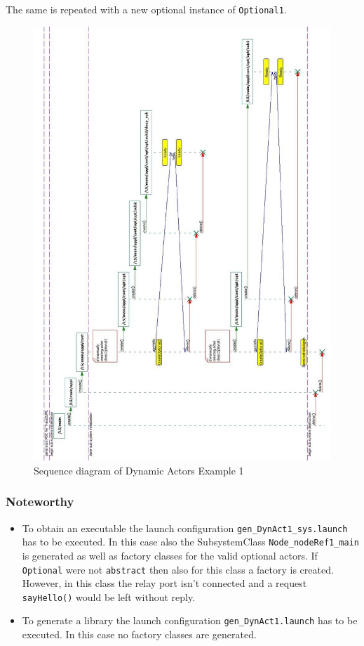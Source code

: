 The same is repeated with a new optional instance of \texttt{Optional1}.

\begin{figure}
\includegraphics[scale=0.45]{images/039-DynAct1-MSC.jpg}
\caption{Sequence diagram of Dynamic Actors Example 1}
\label{fig:dynact1_msc}
\end{figure}

\subsubsection{Noteworthy}

\begin{itemize}
\item To obtain an executable the launch configuration \texttt{gen\_DynAct1\_sys.launch} has to be executed.
In this case also the SubsystemClass \texttt{Node\_nodeRef1\_main} is generated as well as factory classes
for the valid optional actors. If \texttt{Optional} were not \texttt{abstract} then also for this class
a factory is created. However, in this class the relay port isn't connected and a request \texttt{sayHello()}
would be left without reply.
\item To generate a library the launch configuration \texttt{gen\_DynAct1.launch} has to be executed.
In this case no factory classes are generated.
\end{itemize}


